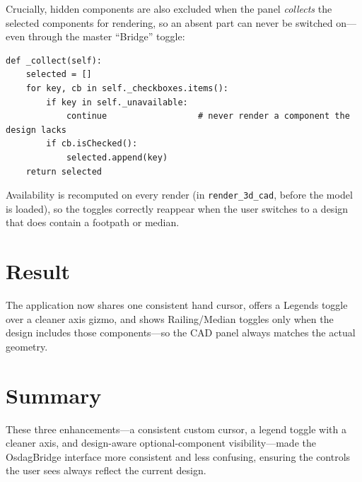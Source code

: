 Crucially, hidden components are also excluded when the panel \emph{collects} the selected
components for rendering, so an absent part can never be switched on---even through the master
``Bridge'' toggle:

\begin{lstlisting}[caption={Excluding unavailable components from the render selection (\texttt{cad\_3d.py}).},label={lst:collect}]
def _collect(self):
    selected = []
    for key, cb in self._checkboxes.items():
        if key in self._unavailable:
            continue                  # never render a component the design lacks
        if cb.isChecked():
            selected.append(key)
    return selected
\end{lstlisting}

Availability is recomputed on every render (in \texttt{render\_3d\_cad}, before the model is
loaded), so the toggles correctly reappear when the user switches to a design that does contain
a footpath or median.

\section{Result}
The application now shares one consistent hand cursor, offers a Legends toggle over a cleaner
axis gizmo, and shows Railing/Median toggles only when the design includes those components---so
the CAD panel always matches the actual geometry.

\section{Summary}
These three enhancements---a consistent custom cursor, a legend toggle with a cleaner axis, and
design-aware optional-component visibility---made the OsdagBridge interface more consistent and
less confusing, ensuring the controls the user sees always reflect the current design.
